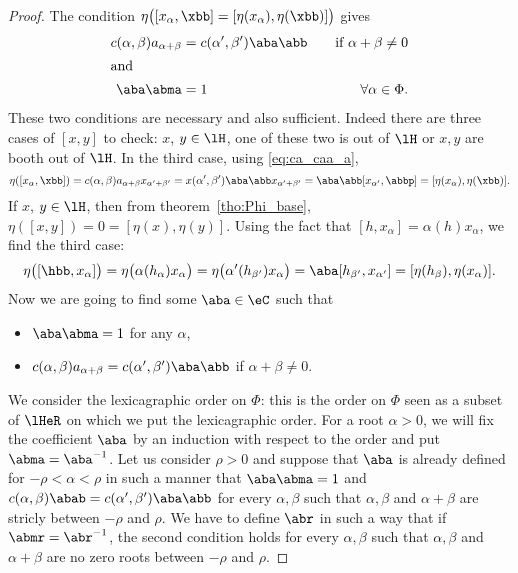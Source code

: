 \begin{proof}
	The condition $\eta\big(  [ x_{\alpha},\xbb]=[\eta( x_{\alpha}),\eta(\xbb)]  \big)$ gives
	\begin{subequations}
		\begin{align}
			\label{eq:ca_caa_a}
			c(\alpha,\beta)a_{\alpha+\beta} & =c(\alpha',\beta')\aba\abb & \quad\text{if }\alpha+\beta\neq 0 \\
			\intertext{and}
			\label{eq:ca_caa_b}
			\aba\abma                       & =1                         & \quad\forall\alpha\in\Phi.
		\end{align}
	\end{subequations}
	These two conditions are necessary and also sufficient. Indeed there are three cases of $[x,y]$ to check: $x$, $y\in\lH$, one of these two is out of $\lH$ or $x,y$ are booth out of $\lH$. In the third case, using \eqref{eq:ca_caa_a},
	\begin{equation}
		\eta([ x_{\alpha},\xbb])=c(\alpha,\beta)a_{\alpha+\beta}x_{\alpha'+\beta'}
		=x(\alpha',\beta')\aba\abb x_{\alpha'+\beta'}
		=\aba\abb[x_{\alpha'},\abbp]
		=[\eta( x_{\alpha}),\eta(\xbb)].
	\end{equation}
	If $x$, $y\in\lH$, then from theorem~\ref{tho:Phi_base}, $\eta([x,y])=0=[\eta(x),\eta(y)]$. Using the fact that $[h, x_{\alpha}]=\alpha(h) x_{\alpha}$, we find the third case:
	\begin{equation}
		\eta\big(  [\hbb, x_{\alpha}]  \big)=\eta\big(  \alpha( h_{\alpha}) x_{\alpha}  \big)
		=\eta\big(  \alpha'(h_{\beta'}) x_{\alpha}  \big)
		=\aba[h_{\beta'},x_{\alpha'}]
		=[\eta(h_{\beta}),\eta( x_{\alpha})].
	\end{equation}
	Now we are going to find some $\aba\in\eC$ such that
	\begin{itemize}
		\item $\aba\abma=1$ for any $\alpha$,
		\item $c(\alpha,\beta)a_{\alpha+\beta}=c(\alpha',\beta')\aba\abb$ if $\alpha+\beta\neq 0$.
	\end{itemize}
	We consider the lexicagraphic order  on $\Phi$: this is the order on $\Phi$ seen as a subset of $\lHeR$ on which we put the lexicagraphic order. For a root $\alpha>0$, we will fix the coefficient $\aba$ by an induction with respect to the order and put $\abma=\aba^{-1}$. Let us consider $\rho>0$ and suppose that $\aba$ is already defined for $-\rho<\alpha<\rho$ in such a manner that $\aba\abma=1$ and $c(\alpha,\beta)\abab=c(\alpha',\beta')\aba\abb$ for every $\alpha,\beta$ such that $\alpha,\beta$ and $\alpha+\beta$ are stricly between $-\rho$ and $\rho$. We have to define $\abr$ in such a way that if $\abmr=\abr^{-1}$, the second condition holds for every $\alpha,\beta$ such that $\alpha,\beta$ and $\alpha+\beta$ are no zero roots between $-\rho$ and $\rho$.


\end{proof}

